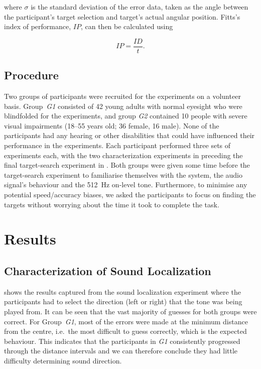 \documentclass[acmsmall]{acmart}
\begin{document}
\noindent
where $\sigma$ is the standard deviation of the error data, taken as the angle between the participant's target selection and target's actual angular position.
Fitts's index of performance, $IP$, can then be calculated using 

\begin{equation}
  \label{eq:fitts-performance}
  IP = \frac{ID}{t}.
\end{equation}

\subsection{Procedure}

Two groups of participants were recruited for the experiments on a volunteer basis. 
Group~\textit{G1} consisted of 42 young adults with normal eyesight who were blindfolded for the experiments, and group \textit{G2} contained 10 people with severe visual impairments (18--55 years old; 36 female, 16 male). 
None of the participants had any hearing or other disabilities that could have influenced their performance in the experiments.
Each participant performed three sets of experiments each, with the two characterization experiments in  preceding the final target-search experiment in . 
Both groups were given some time before the target-search experiment to familiarise themselves with the system, the audio signal's behaviour and the \SI{512}{\hertz} on-level tone. 
Furthermore, to minimise any potential speed/accuracy biases, we asked the participants to focus on finding the targets without worrying about the time it took to complete the task. 

\section{Results}\label{sec:results}

\subsection{Characterization of Sound Localization}

 shows the results captured from the sound localization experiment where the participants had to select the direction (left or right) that the tone was being played from. 
It can be seen that the vast majority of guesses for both groups were correct.
For Group~\textit{G1}, most of the errors were made at the minimum distance from the centre, i.e.\ the most difficult to guess correctly, which is the expected behaviour.
This indicates that the participants in \textit{G1} consistently progressed through the distance intervals and we can therefore conclude they had little difficulty determining sound direction.
\end{document}
